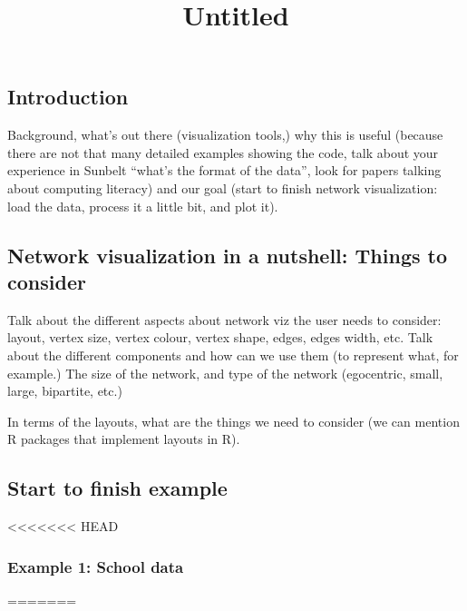 \documentclass[
]{apa7}
\title{Untitled}
\author{}
\date{}
\begin{document}
\maketitle
\ifdefined\Shaded\renewenvironment{Shaded}{\begin{tcolorbox}[interior hidden, boxrule=0pt, borderline west={3pt}{0pt}{shadecolor}, enhanced, breakable, sharp corners, frame hidden]}{\end{tcolorbox}}\fi

\hypertarget{introduction}{%
\subsection{Introduction}\label{introduction}}

Background, what's out there (visualization tools,) why this is useful
(because there are not that many detailed examples showing the code,
talk about your experience in Sunbelt ``what's the format of the data'',
look for papers talking about computing literacy) and our goal (start to
finish network visualization: load the data, process it a little bit,
and plot it).

\hypertarget{network-visualization-in-a-nutshell-things-to-consider}{%
\subsection{Network visualization in a nutshell: Things to
consider}\label{network-visualization-in-a-nutshell-things-to-consider}}

Talk about the different aspects about network viz the user needs to
consider: layout, vertex size, vertex colour, vertex shape, edges, edges
width, etc. Talk about the different components and how can we use them
(to represent what, for example.) The size of the network, and type of
the network (egocentric, small, large, bipartite, etc.)

In terms of the layouts, what are the things we need to consider (we can
mention R packages that implement layouts in R).

\hypertarget{start-to-finish-example}{%
\subsection{Start to finish example}\label{start-to-finish-example}}

<<<<<<< HEAD
\hypertarget{example-1-school-data}{%
\subsubsection{Example 1: School data}\label{example-1-school-data}}
=======
\end{document}
